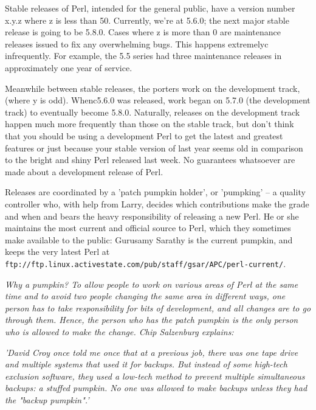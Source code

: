 \documentclass[a4paper,11pt]{book}
\begin{document}
\noindent 

\noindent Stable releases of Perl, intended for the general public, have a version number x.y.z  where  z  is less than 50. Currently, we're at 5.6.0; the next major stable release is going to be 5.8.0. Cases where z is more than 0 are maintenance releases issued to fix any overwhelming bugs. This happens extremelyc infrequently. For example, the 5.5 series had three maintenance releases in approximately one year of service.

\noindent 

\noindent Meanwhile between stable releases, the porters work on the development track, (where y is odd). Whenc5.6.0 was released, work began on 5.7.0 (the development track) to eventually become 5.8.0. Naturally, releases on the development track happen much more frequently than those on the stable track, but don't think that you should be using a development Perl to get the latest and greatest features or just because your stable version of last year seems old in comparison to the bright and shiny Perl released last week. No guarantees whatsoever are made about a development release of Perl.

\noindent 

\noindent Releases are coordinated by a 'patch pumpkin holder', or 'pumpking' -- a quality controller who, with help from Larry, decides which contributions make the grade and when and bears the heavy responsibility of releasing a new Perl. He or she maintains the most current and official source to Perl, which they sometimes make available to the public: Gurusamy Sarathy is the current pumpkin, and keeps the very latest Perl at \texttt{ftp://ftp.linux.activestate.com/pub/staff/gsar/APC/perl-current/}.

\noindent 

\textit{Why a pumpkin? To allow people to work on various areas of Perl at the same time and to avoid two people changing the same area in different ways, one person has to take responsibility for bits of development, and all changes are to go through them. Hence, the person who has the patch pumpkin is the only person who is allowed to make the change. Chip Salzenburg explains:}

\noindent \textit{'David Croy once told me once that at a previous job, there was one tape drive and multiple systems that used it for backups. But instead of some high-tech exclusion software, they used a low-tech method to prevent multiple simultaneous backups: a stuffed pumpkin. No one was allowed to make backups unless they had the "backup pumpkin".'}
\end{document}
